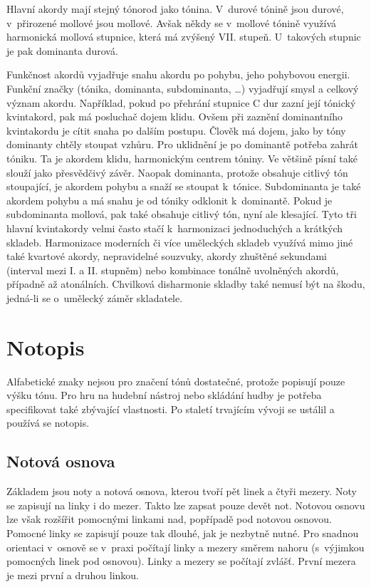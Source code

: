 Hlavní akordy mají stejný tónorod jako tónina.
V~durové tónině jsou durové, v~přirozené mollové jsou mollové.
Avšak někdy se v~mollové tónině využívá harmonická mollová stupnice,
která má zvýšený VII. stupeň.
U~takových stupnic je pak dominanta durová.
\cite{kofron}
\par

Funkčnost akordů vyjadřuje snahu akordu po pohybu, jeho pohybovou energii.
Funkční značky (tónika, dominanta, subdominanta, \dots) 
vyjadřují smysl a celkový význam akordu.
Například, pokud po přehrání stupnice C dur zazní její tónický kvintakord,
pak má posluchač dojem klidu.
Ovšem při zaznění dominantního kvintakordu je cítit snaha po dalším postupu.
Člověk má dojem, jako by tóny dominanty chtěly stoupat vzhůru.
Pro uklidnění je po dominantě potřeba zahrát tóniku.
Ta je akordem klidu, harmonickým centrem tóniny.
\cite{kofron}
Ve většině písní také slouží jako přesvědčivý závěr.
\cite{zenkl}
Naopak dominanta, protože obsahuje citlivý tón stoupající, 
je akordem pohybu a snaží se stoupat k~tónice.
\cite{kofron}
Subdominanta je také akordem pohybu 
a má snahu je od tóniky odklonit k~dominantě.
\cite{zenkl}
Pokud je subdominanta mollová, pak také obsahuje citlivý tón, 
nyní ale klesající.
Tyto tři hlavní kvintakordy velmi často stačí 
k~harmonizaci jednoduchých a krátkých skladeb.
\cite{kofron}
Harmonizace moderních či více uměleckých skladeb využívá mimo jiné
také kvartové akordy, nepravidelné souzvuky,
akordy zhuštěné sekundami (interval mezi I. a II. stupněm) nebo
kombinace tonálně uvolněných akordů, případně až atonálních.
Chvilková disharmonie skladby také nemusí být na škodu,
jedná-li se o~umělecký záměr skladatele.
\cite{zenkl}
\par

\section{Notopis}
Alfabetické znaky nejsou pro značení tónů dostatečné, protože popisují pouze výšku tónu.
Pro hru na hudební nástroj nebo skládání hudby je potřeba specifikovat také zbývající vlastnosti.
Po staletí trvajícím vývoji se ustálil a používá se notopis.\par

\subsection{Notová osnova}
Základem jsou noty a notová osnova, kterou tvoří pět linek a čtyři mezery.
Noty se zapisují na linky i do mezer.
Takto lze zapsat pouze devět not.
Notovou osnovu lze však rozšířit pomocnými linkami nad, popřípadě pod notovou osnovou. 
Pomocné linky se zapisují pouze tak dlouhé, jak je nezbytně nutné.
Pro snadnou orientaci v~osnově se v~praxi počítají linky a mezery směrem nahoru (s~výjimkou pomocných linek pod osnovou). 
Linky a mezery se počítají zvlášť. 
První mezera je mezi první a druhou linkou.\par


